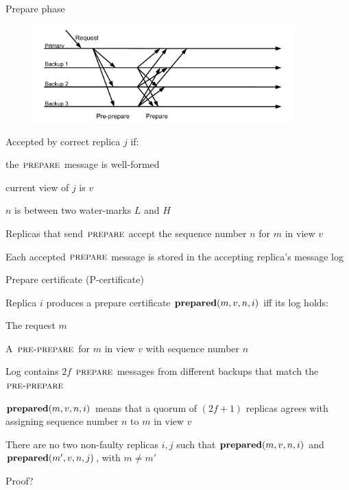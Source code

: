 \begin{frame}{Prepare phase}

\begin{figure}
\includegraphics[width=0.9\textwidth, trim=0 20 0 60]{messages2}
\end{figure}
\begin{overprint}
\BI
\item Accepted by correct replica $j$ if:
\BI
\item the $\textsc{prepare}$ message is well-formed
\item current view of $j$ is $v$
\item $n$ is between two water-marks $L$ and $H$
\EI
\EI

\BI
\item Replicas that send $\textsc{prepare}$ accept the sequence number $n$ for $m$ in view $v$
\item Each accepted $\textsc{prepare}$ message is stored in the accepting replica's message log
\EI

\end{overprint}
\end{frame}

\begin{frame}{Prepare certificate (P-certificate)}

\BIL
\item Replica $i$ produces a \alert{prepare certificate} $\mathbf{prepared}(m,v,n,i)$ iff its log holds:
	\BI
	\item The request $m$
	\item A $\textsc{pre-prepare}$ for $m$ in view $v$ with sequence number $n$
	\item Log contains $2f$ $\textsc{prepare}$ messages from different backups that match the $\textsc{pre-prepare}$
	\EI
\item $\mathbf{prepared}(m,v,n,i)$ means that a quorum of \alert{$(2f+1)$} replicas agrees with assigning sequence number $n$ to $m$ in view $v$
\EIL

\smallskip
\begin{theorem}
There are no two non-faulty replicas $i, j$ such that $\mathbf{prepared}(m, v, n, i)$
and $\mathbf{prepared}(m',v , n, j)$, with $m \neq m'$
\end{theorem}

\smallskip
Proof?

\end{frame}

